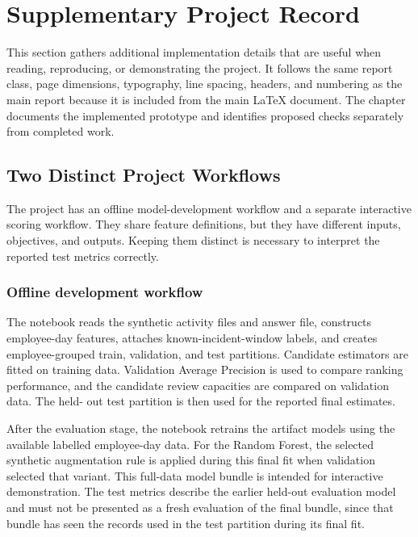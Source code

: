 
\section{Supplementary Project Record}
This section gathers additional implementation details that are useful
when reading, reproducing, or demonstrating the project. It follows the
same report class, page dimensions, typography, line spacing, headers,
and numbering as the main report because it is included from the main
LaTeX document. The chapter documents the implemented prototype and
identifies proposed checks separately from completed work.

\subsection{Two Distinct Project Workflows}
The project has an offline model-development workflow and a separate
interactive scoring workflow. They share feature definitions, but they
have different inputs, objectives, and outputs. Keeping them distinct
is necessary to interpret the reported test metrics correctly.

\subsubsection{Offline development workflow}
The notebook reads the synthetic activity files and answer file,
constructs employee-day features, attaches known-incident-window
labels, and creates employee-grouped train, validation, and test
partitions. Candidate estimators are fitted on training data. Validation
Average Precision is used to compare ranking performance, and the
candidate review capacities are compared on validation data. The held-
out test partition is then used for the reported final estimates.

After the evaluation stage, the notebook retrains the artifact models
using the available labelled employee-day data. For the Random Forest,
the selected synthetic augmentation rule is applied during this final
fit when validation selected that variant. This full-data model bundle
is intended for interactive demonstration. The test metrics describe
the earlier held-out evaluation model and must not be presented as a
fresh evaluation of the final bundle, since that bundle has seen the
records used in the test partition during its final fit.

